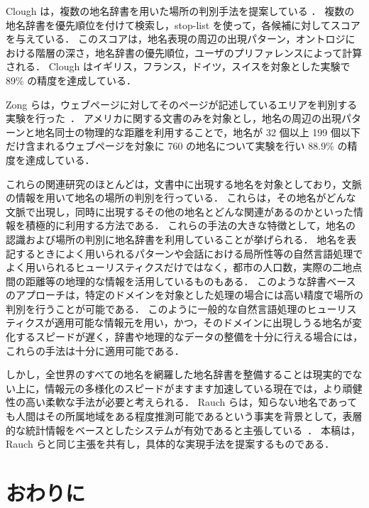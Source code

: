 \documentclass[japanese]{jnlp_1.4}
\begin{document}
Clough は，複数の地名辞書を用いた場所の判別手法を提案している \cite{Clough05}．
複数の地名辞書を優先順位を付けて検索し，stop-list を使って，各候補に対してスコアを与えている．
このスコアは，地名表現の周辺の出現パターン，オントロジにおける階層の深さ，地名辞書の優先順位，ユーザのプリファレンスによって計算される．
Clough はイギリス，フランス，ドイツ，スイスを対象とした実験で 89\% の精度を達成している．

Zong らは，ウェブページに対してそのページが記述しているエリアを判別する実験を行った~\cite{Zong05}．
アメリカに関する文書のみを対象とし，地名の周辺の出現パターンと地名同士の物理的な距離を利用することで，地名が 32 個以上 199 個以下だけ含まれるウェブページを対象に 760 の地名について実験を行い 88.9\% の精度を達成している．

これらの関連研究のほとんどは，文書中に出現する地名を対象としており，文脈の情報を用いて地名の場所の判別を行っている．
これらは，その地名がどんな文脈で出現し，同時に出現するその他の地名とどんな関連があるのかといった情報を積極的に利用する方法である．
これらの手法の大きな特徴として，地名の認識および場所の判別に地名辞書を利用していることが挙げられる．
地名を表記するときによく用いられるパターンや会話における局所性等の自然言語処理でよく用いられるヒューリスティクスだけではなく，都市の人口数，実際の二地点間の距離等の地理的な情報を活用しているものもある．
このような辞書ベースのアプローチは，特定のドメインを対象とした処理の場合には高い精度で場所の判別を行うことが可能である．
このように一般的な自然言語処理のヒューリスティクスが適用可能な情報元を用い，かつ，そのドメインに出現しうる地名が変化するスピードが遅く，辞書や地理的なデータの整備を十分に行える場合には，これらの手法は十分に適用可能である．

しかし，全世界のすべての地名を網羅した地名辞書を整備することは現実的でない上に，情報元の多様化のスピードがますます加速している現在では，より頑健性の高い柔軟な手法が必要と考えられる．
Rauch らは，知らない地名であっても人間はその所属地域をある程度推測可能であるという事実を背景として，表層的な統計情報をベースとしたシステムが有効であると主張している~\cite{Rauch03aconfidence-based}．
本稿は，Rauch らと同じ主張を共有し，具体的な実現手法を提案するものである．


\section{おわりに}
\label{sec:conclusion}
\end{document}

